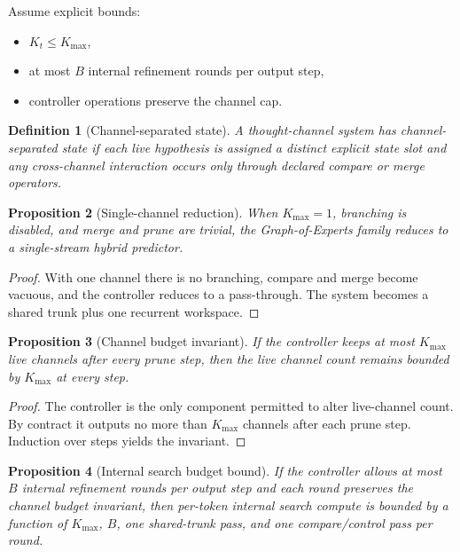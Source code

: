 \documentclass[11pt]{article}
\newtheorem{definition}{Definition}[section]
\newtheorem{proposition}[definition]{Proposition}
\begin{document}
Assume explicit bounds:
\begin{itemize}
  \item $K_t \le K_{\max}$,
  \item at most $B$ internal refinement rounds per output step,
  \item controller operations preserve the channel cap.
\end{itemize}

\begin{definition}[Channel-separated state]
A thought-channel system has channel-separated state if each live hypothesis is
assigned a distinct explicit state slot and any cross-channel interaction occurs
only through declared compare or merge operators.
\end{definition}

\begin{proposition}[Single-channel reduction]
When $K_{\max} = 1$, branching is disabled, and merge and prune are trivial, the
Graph-of-Experts family reduces to a single-stream hybrid predictor.
\end{proposition}

\begin{proof}
With one channel there is no branching, compare and merge become vacuous, and
the controller reduces to a pass-through. The system becomes a shared trunk
plus one recurrent workspace.
\end{proof}

\begin{proposition}[Channel budget invariant]
If the controller keeps at most $K_{\max}$ live channels after every prune
step, then the live channel count remains bounded by $K_{\max}$ at every step.
\end{proposition}

\begin{proof}
The controller is the only component permitted to alter live-channel count. By
contract it outputs no more than $K_{\max}$ channels after each prune step.
Induction over steps yields the invariant.
\end{proof}

\begin{proposition}[Internal search budget bound]
If the controller allows at most $B$ internal refinement rounds per output step
and each round preserves the channel budget invariant, then per-token internal
search compute is bounded by a function of $K_{\max}$, $B$, one shared-trunk
pass, and one compare/control pass per round.
\end{proposition}
\end{document}
